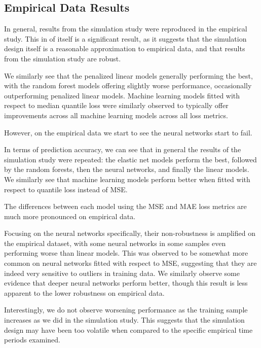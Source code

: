 \documentclass[11pt, a4paper, table]{article}
\begin{document}
\newpage

\subsection{Empirical Data Results}


In general, results from the simulation study were reproduced in the empirical study. This in of itself is a significant result, as it suggests that the simulation design itself is a reasonable approximation to empirical data, and that results from the simulation study are robust.

We similarly see that the penalized linear models generally performing the best, with the random forest models offering slightly worse performance, occasionally outperforming penalized linear models. Machine learning models fitted with respect to median quantile loss were similarly observed to typically offer improvements across all machine learning models across all loss metrics. 

However, on the empirical data we start to see the neural networks start to fail. 


In terms of prediction accuracy, we can see that in general the results of the simulation study were repeated: the elastic net models perform the best, followed by the random forests, then the neural networks, and finally the linear models. We similarly see that machine learning models perform better when fitted with respect to quantile loss instead of MSE. 

The differences between each model using the MSE and MAE loss metrics are much more pronounced on empirical data.

Focusing on the neural networks specifically, their non-robustness is amplified on the empirical dataset, with some neural networks in some samples even performing worse than linear models. This was observed to be somewhat more common on neural networks fitted with respect to MSE, suggesting that they are indeed very sensitive to outliers in training data. We similarly observe some evidence that deeper neural networks perform better, though this result is less apparent to the lower robustness on empirical data.

Interestingly, we do not observe worsening performance as the training sample increases as we did in the simulation study. This suggests that the simulation design may have been too volatile when compared to the specific empirical time periods examined.
\end{document}
